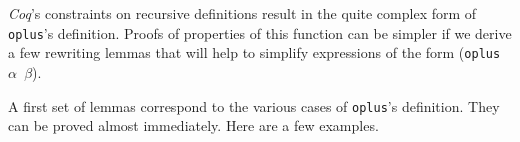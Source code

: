     \emph{Coq}'s constraints on recursive definitions result in 
    the quite  complex form of \texttt{oplus}'s definition.
    Proofs of properties of this function can be simpler if we
     derive a few  rewriting lemmas that will help to simplify 
    expressions of the form (\texttt{oplus $\alpha$ $\beta$}).

    A first set of lemmas correspond to the various cases of \texttt{oplus}'s 
    definition. They can be proved almost immediately. Here are a few examples.
    


   
    











